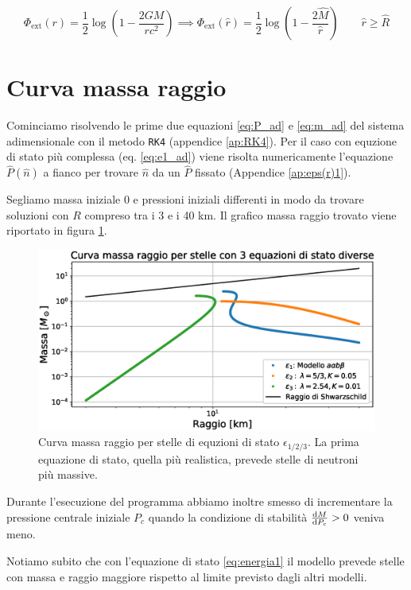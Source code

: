 \documentclass[a4paper, titlepage]{article}
\begin{document}
\begin{equation}
    \Phi_\text{ext} (r) = \frac{1}{2} \log(1 - \frac{2 G M}{r c^2})
    \implies \Phi_\text{ext} (\hat r) = \frac{1}{2}
    \log(1 - \frac{2 \hat{M}}{\hat r}) \quad \quad \hat r \geq \hat{R}
    \label{eq:Phi_ext}
\end{equation}


\section{Curva massa raggio}
Cominciamo risolvendo le prime due equazioni \ref{eq:P_ad} e \ref{eq:m_ad}
del sistema adimensionale con il metodo \texttt{RK4} (appendice \ref{ap:RK4}).
Per il caso con equzione di stato più complessa (eq. \ref{eq:e1_ad}) viene
risolta numericamente l'equazione $\hat P(\hat n)$ a fianco per trovare $\hat n$
da un $\hat P$ fissato (Appendice \ref{ap:eps(r)1}).

Segliamo massa iniziale 0 e pressioni iniziali differenti in modo da trovare
soluzioni con $R$ compreso tra i 3 e i 40 \unit{\kilo\meter}.
Il grafico massa raggio trovato viene riportato in figura \ref{fig:MR}.

\begin{figure}[h]
        \centering
        \includegraphics[width = 0.7 \textwidth]{Figures/MR.eps}
        \caption{Curva massa raggio per stelle di equzioni di stato
        $\epsilon_{1/2/3}$.
        La prima equazione di stato, quella più realistica,
        prevede stelle di neutroni più massive.}
        \label{fig:MR}
\end{figure}

Durante l'esecuzione del programma abbiamo inoltre smesso di incrementare la
pressione centrale iniziale $P_c$ quando la condizione di stabilità
$\dv{M}{P_c} > 0$ veniva meno.

Notiamo subito che con l'equazione di stato \ref{eq:energia1} il modello prevede
stelle con massa e raggio maggiore rispetto al limite previsto dagli altri
modelli.
\end{document}

